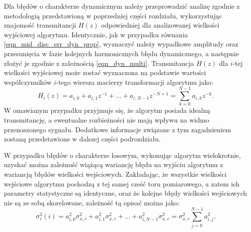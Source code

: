 Dla błędów o charakterze dynamicznym należy przeprowadzić analizę zgodnie z metodologią przedstawioną w poprzedniej części rozdziału, wykorzystując znajomość transmitancji $H(z)$ odpowiedniej dla analizowanej wielkości wyjściowej algorytmu. Identycznie, jak w przypadku równania \eqref{eqn_mid_disc_err_dyn_prop}, wyznaczyć należy wypadkowe amplitudy oraz przesunięcia w fazie kolejnych harmonicznych błędu dynamicznego, a następnie złożyć je zgodnie z zależnością \eqref{eqn_dyn_multi}. Transmitancja $H(z)$ dla $i$-tej wielkości wyjściowej może zostać wyznaczona na podstawie wartości współczynników $i$-tego wiersza macierzy transformacji algorytmu jako:
\begin{equation}
H_{i}(z) = a_{i, 0} + a_{i, 1} z^{-1} + \hdots + a_{i, N-1} z^{-N+1} = \sum _{k = 0} ^{N-1} a_{i, k} z^{-k} \label{eqn_alg_trans_single}.
\end{equation}
W omawianym przypadku przyjmuje się, że algorytm posiada idealną transmitancję, a ewentualne rozbieżności nie mają wpływu na widmo przenoszonego sygnału. Dodatkowe informacje związane z tym zagadnieniem zostaną przedstawione w dalszej części podrozdziału.

W przypadku błędów o charakterze losowym, wykonując algorytm wielokrotnie, uzyskać można zależność wiążącą wariancję błędu na wyjściu algorytmu z wariancją błędów wielkości wejściowych. Zakładając, że wszystkie wielkości wejściowe algorytmu pochodzą z tej samej cześć toru pomiarowego, a zatem ich parametry statystyczne są identyczne, oraz że kolejne błędy wielkości wejściowych nie są ze sobą skorelowane, zależność tą opisać można jako:
\begin{equation}
\sigma_{r}^{2}(i) = a_{i, 0}^{2} \sigma_{x,r}^{2} + a_{i, 1}^{2} \sigma_{x,r}^{2} + \hdots + a_{i, N-1}^{2} \sigma_{x,r}^{2} = \sigma_{x,r}^{2} \sum _{j=0} ^{N-1} {a_{i, j}^{2}} \label{eqn_alg_outvar_rand}.
\end{equation}


